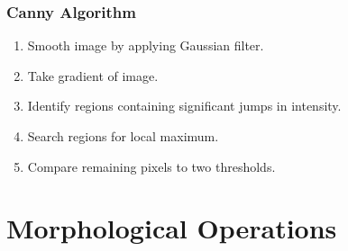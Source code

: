 \documentclass{beamer}
\begin{document}
\begin{frame}
\frametitle{Canny Algorithm}
\begin{enumerate}
\item Smooth image by applying Gaussian filter.
\linebreak
\item Take gradient of image.
\linebreak
\item Identify regions containing significant jumps in intensity.
\linebreak
\item Search regions for local maximum.
\linebreak
\item Compare remaining pixels to two thresholds.
\end{enumerate}
\end{frame}

\section[Morphological Operations]{Morphological Operations}
\end{document}
